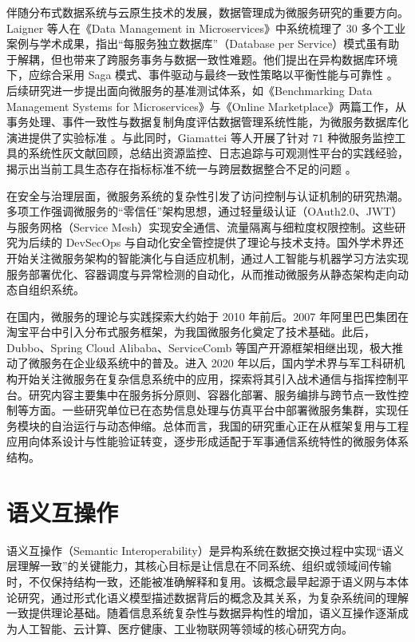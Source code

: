 伴随分布式数据系统与云原生技术的发展，数据管理成为微服务研究的重要方向。Laigner 等人在《Data Management in Microservices》中系统梳理了 30 多个工业案例与学术成果，指出“每服务独立数据库”（Database per Service）模式虽有助于解耦，但也带来了跨服务事务与数据一致性难题。他们提出在异构数据库环境下，应综合采用 Saga 模式、事件驱动与最终一致性策略以平衡性能与可靠性 \cite{Laigner2021Data}。后续研究进一步提出面向微服务的基准测试体系，如《Benchmarking Data Management Systems for Microservices》与《Online Marketplace》两篇工作，从事务处理、事件一致性与数据复制角度评估数据管理系统性能，为微服务数据库化演进提供了实验标准 \cite{BenchmarkingDataMgmt2024,OnlineMarketplace2024}。与此同时，Giamattei 等人开展了针对 71 种微服务监控工具的系统性灰文献回顾，总结出资源监控、日志追踪与可观测性平台的实践经验，揭示出当前工具生态存在指标标准不统一与跨层数据整合不足的问题 \cite{MonitoringTools2023}。

在安全与治理层面，微服务系统的复杂性引发了访问控制与认证机制的研究热潮。多项工作强调微服务的“零信任”架构思想，通过轻量级认证（OAuth2.0、JWT）与服务网格（Service Mesh）实现安全通信、流量隔离与细粒度权限控制。这些研究为后续的 DevSecOps 与自动化安全管控提供了理论与技术支持。国外学术界还开始关注微服务架构的智能演化与自适应机制，通过人工智能与机器学习方法实现服务部署优化、容器调度与异常检测的自动化，从而推动微服务从静态架构走向动态自组织系统。

在国内，微服务的理论与实践探索大约始于 2010 年前后。2007 年阿里巴巴集团在淘宝平台中引入分布式服务框架，为我国微服务化奠定了技术基础。此后，Dubbo、Spring Cloud Alibaba、ServiceComb 等国产开源框架相继出现，极大推动了微服务在企业级系统中的普及。进入 2020 年以后，国内学术界与军工科研机构开始关注微服务在复杂信息系统中的应用，探索将其引入战术通信与指挥控制平台。研究内容主要集中在服务拆分原则、容器化部署、服务编排与跨节点一致性控制等方面。一些研究单位已在态势信息处理与仿真平台中部署微服务集群，实现任务模块的自治运行与动态伸缩。总体而言，我国的研究重心正在从框架复用与工程应用向体系设计与性能验证转变，逐步形成适配于军事通信系统特性的微服务体系结构。


\section{语义互操作}

语义互操作（Semantic Interoperability）是异构系统在数据交换过程中实现“语义层理解一致”的关键能力，其核心目标是让信息在不同系统、组织或领域间传输时，不仅保持结构一致，还能被准确解释和复用。该概念最早起源于语义网与本体论研究，通过形式化语义模型描述数据背后的概念及其关系，为复杂系统间的理解一致提供理论基础。随着信息系统复杂性与数据异构性的增加，语义互操作逐渐成为人工智能、云计算、医疗健康、工业物联网等领域的核心研究方向。

